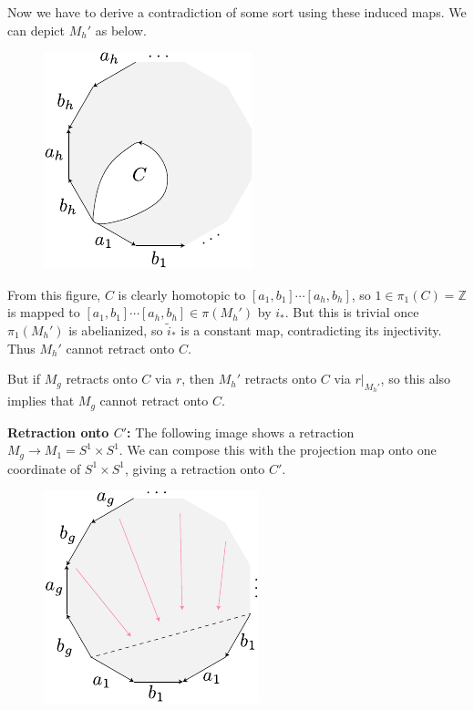 \documentclass[twoside,10pt]{article}
\begin{document}
Now we have to derive a contradiction of some sort using these induced maps. We can depict $M_h'$ as below.

\begin{figure}[H]
	\centering
	\includegraphics[scale=1]{fig/9a.pdf}
\end{figure}

From this figure, $C$ is clearly homotopic to $[a_1,b_1]\cdots [a_h,b_h]$, so $1 \in \pi_1(C) = \mathbb{Z}$ is mapped to $[a_1,b_1]\cdots [a_h,b_h] \in \pi(M_{h}')$ by $i_{*}$. But this is trivial once $\pi_1(M_{h}')$ is abelianized, so $\tilde{i}_{*}$ is a constant map, contradicting its injectivity. Thus $M_{h}'$ cannot retract onto $C$.

But if $M_{g}$ retracts onto $C$ via $r$, then $M_{h}'$ retracts onto $C$ via $r|_{M_{h}'}$, so this also implies that $M_{g}$ cannot retract onto $C$.

\textbf{Retraction onto $C'$:} The following image shows a retraction $M_{g} \to M_{1} = S^{1}\times S^{1}$. We can compose this with the projection map onto one coordinate of $S^{1}\times S^{1}$, giving a retraction onto $C'$.

\begin{figure}[H]
	\centering
	\includegraphics[scale=1]{fig/9b.pdf}
\end{figure}
\end{document}
